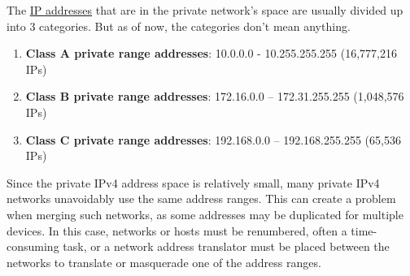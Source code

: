 \documentclass{article}
\newcounter{definition}[section]
\begin{document}
  \begin{definition}
    \label{def:private-address-ranges}
  The \hyperref[def:ip-addresses]{IP addresses} that are in the private network's space are usually divided up into 3 categories. But as of now, the categories don't mean anything. 
  \begin{enumerate}
      \item \textbf{Class A private range addresses}: 10.0.0.0 - 10.255.255.255 (16,777,216 IPs)
      \item \textbf{Class B private range addresses}: 172.16.0.0 – 172.31.255.255 (1,048,576 IPs)
      \item \textbf{Class C private range addresses}: 192.168.0.0 – 192.168.255.255 (65,536 IPs)
  \end{enumerate}
  Since the private IPv4 address space is relatively small, many private IPv4 networks unavoidably use the same address ranges. This can create a problem when merging such networks, as some addresses may be duplicated for multiple devices. In this case, networks or hosts must be renumbered, often a time-consuming task, or a network address translator must be placed between the networks to translate or masquerade one of the address ranges. 
  \end{definition}
\end{document}
